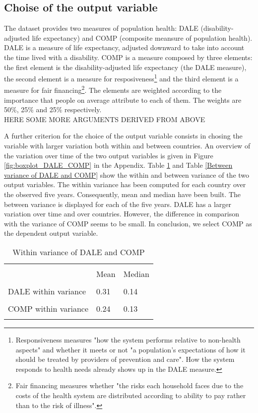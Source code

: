 \documentclass[12pt,a4paper]{article}\usepackage[]{graphicx}\usepackage[]{color}
\begin{document}
\subsection{Choise of the output variable}
The dataset provides two measures of population health: DALE (disability-adjusted life expectancy) and COMP (composite meansure of population health). DALE is a measure of life expectancy, adjusted downward to take into account the time lived with a disability. COMP is a measure composed by three elements: the first element is the disability-adjusted life expectancy (the DALE measure), the second element is a measure for resposiveness\footnote{Responsiveness measures "how the system performs relative to non-health aspects" and whether it meets or not "a population's expectations of how it should be treated by providers of prevention and care". How the system responds to health needs already shows up in the DALE measure.} and the third element is a measure for fair financing\footnote{Fair financing measures whether "the risks each household faces due to the costs of the health system are distributed according to ability to pay rather than to the risk of illness".}. The elements are weighted according to the importance that people on average attribute to each of them. The weights are 50\%, 25\% and 25\% respectively. \\


HERE SOME MORE ARGUMENTS DERIVED FROM ABOVE


A further criterion for the choice of the output variable consists in chosing the variable with larger variation both within and between countries. An overview of the variation over time of the two output variables is given in Figure \ref{fig:boxplot_DALE_COMP} in the Appendix. Table \ref{Within variance of DALE and COMP} and Table \ref{Between variance of DALE and COMP} show the within and between variance of the two output variables. The within variance has been computed for each country over the observed five years. Consequently, mean and median have been built. The between variance is displayed for each of the five years. DALE has a larger variation over time and over countries. However, the difference in comparison with the variance of COMP seems to be small. In conclusion, we select COMP as the dependent output variable.



\begin{table}[htbp] \centering 
  \caption{Within variance of DALE and COMP} 
  \label{Within variance of DALE and COMP} 
  \normalsize
\begin{tabular}{p{5cm} p{1.5cm} p{1.5cm}} 
\\[-1.8ex]\hline 
\hline \\[-1.8ex] 
 & Mean & Median \\ 
\hline \\[-1.8ex] 
DALE within variance & 0.31 & 0.14 \\
\hline \\[-1.8ex] 
COMP within variance & 0.24 & 0.13 \\
\hline
\hline \\[-1.8ex] 
\end{tabular} 
\end{table} 
\end{document}
